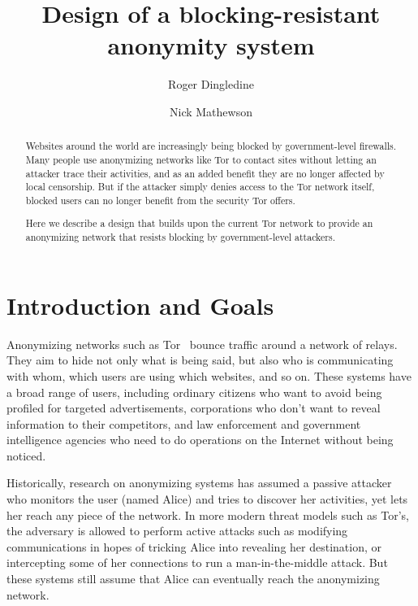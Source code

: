 \documentclass{llncs}
\begin{document}
\title{Design of a blocking-resistant anonymity system}

\author{Roger Dingledine \and
Nick Mathewson}

\maketitle
\pagestyle{plain}

\begin{abstract}

Websites around the world are increasingly being blocked by
government-level firewalls. Many people use anonymizing networks like
Tor to contact sites without letting an attacker trace their activities,
and as an added benefit they are no longer affected by local censorship.
But if the attacker simply denies access to the Tor network itself,
blocked users can no longer benefit from the security Tor offers.

Here we describe a design that builds upon the current Tor network
to provide an anonymizing network that resists blocking
by government-level attackers.

\end{abstract}

\section{Introduction and Goals}

Anonymizing networks such as Tor~\cite{tor-design} bounce traffic around
a network of relays. They aim to hide not only what is being said, but
also who is communicating with whom, which users are using which websites,
and so on. These systems have a broad range of users, including ordinary
citizens who want to avoid being profiled for targeted advertisements,
corporations who don't want to reveal information to their competitors,
and law enforcement and government intelligence agencies who need to do
operations on the Internet without being noticed.

Historically, research on anonymizing systems has assumed a passive
attacker who monitors the user (named Alice) and tries to discover her
activities, yet lets her reach any piece of the network. In more modern
threat models such as Tor's, the adversary is allowed to perform active
attacks such as modifying communications in hopes of tricking Alice
into revealing her destination, or intercepting some of her connections
to run a man-in-the-middle attack. But these systems still assume that
Alice can eventually reach the anonymizing network.
\end{document}
